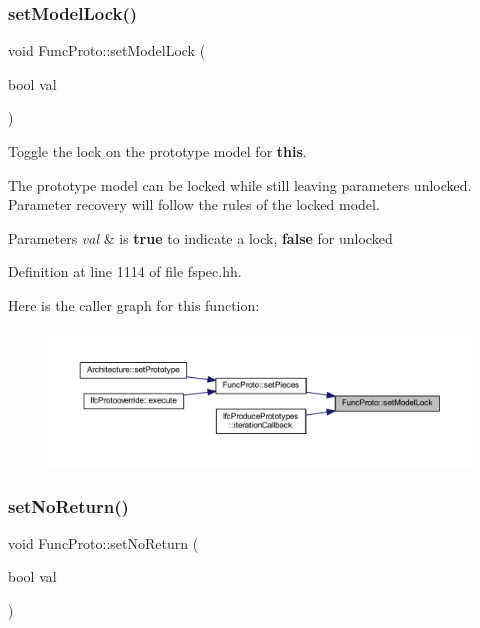 \subsubsection{\texorpdfstring{setModelLock()}{setModelLock()}}
{\footnotesize\ttfamily void Func\+Proto\+::set\+Model\+Lock (\begin{DoxyParamCaption}\item[{bool}]{val }\end{DoxyParamCaption})\hspace{0.3cm}{\ttfamily [inline]}}



Toggle the lock on the prototype model for {\bfseries{this}}. 

The prototype model can be locked while still leaving parameters unlocked. Parameter recovery will follow the rules of the locked model. 
\begin{DoxyParams}{Parameters}
{\em val} & is {\bfseries{true}} to indicate a lock, {\bfseries{false}} for unlocked \\
\hline
\end{DoxyParams}


Definition at line 1114 of file fspec.\+hh.

Here is the caller graph for this function\+:
\nopagebreak
\begin{figure}[H]
\begin{center}
\leavevmode
\includegraphics[width=350pt]{class_func_proto_acc303c449c418dd875319c6f6cd9436f_icgraph}
\end{center}
\end{figure}
\mbox{\label{class_func_proto_aacaf0bda9b424dfd5c6a28d3a45fb100}} 
\subsubsection{\texorpdfstring{setNoReturn()}{setNoReturn()}}
{\footnotesize\ttfamily void Func\+Proto\+::set\+No\+Return (\begin{DoxyParamCaption}\item[{bool}]{val }\end{DoxyParamCaption})\hspace{0.3cm}{\ttfamily [inline]}}



